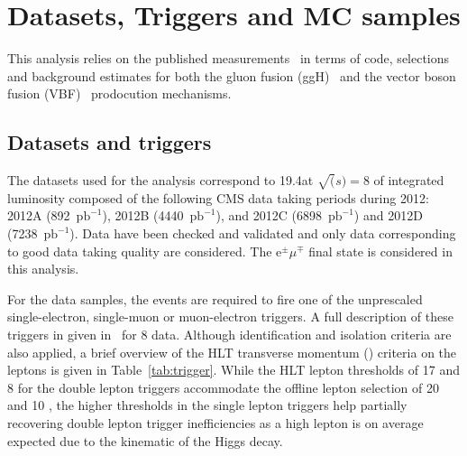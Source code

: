 \section{Datasets, Triggers and MC samples}
\label{sec:Datasets}

This analysis relies on the published \hww measurements~\cite{Chatrchyan:2013iaa} in terms of code, selections and background estimates for both the gluon fusion (ggH)~\cite{AN-2013-022} and the vector boson fusion (VBF)~\cite{AN-13-097} prodocution mechanisms.

\subsection{Datasets and triggers\label{subsec:Datasets}}

The datasets used for the analysis correspond to 19.4\ifb at $\sqrt(s)=8$ \TeV  of integrated luminosity composed of the following CMS data taking periods during 2012: 2012A (892~$\mathrm{pb}^{-1}$), 2012B (4440~$\mathrm{pb}^{-1}$), and 2012C (6898~$\mathrm{pb}^{-1}$) and 2012D (7238~$\mathrm{pb}^{-1}$).
Data have been checked and validated and only data corresponding to good data taking quality are considered.
The $\mathrm{e}^{\pm}\mu^{\mp}$ final state is considered in this analysis.

For the data samples, the events are required to fire one of the unprescaled
single-electron, single-muon or muon-electron triggers.
A full description of these triggers in given in~\cite{AN-2012-228} for 8 \TeV data. Although identification and isolation criteria are
also applied, a brief overview of the HLT transverse momentum (\pt) criteria on the leptons
is given in Table~\ref{tab:trigger}. While the HLT lepton \pt thresholds of 17 and 8 \GeV for the double
lepton triggers accommodate the offline lepton \pt selection of 20 and 10 \GeV, the higher \pt thresholds
in the single lepton triggers help partially recovering double lepton trigger inefficiencies
as a high \pt lepton is on average expected due to the kinematic of the Higgs decay. 


